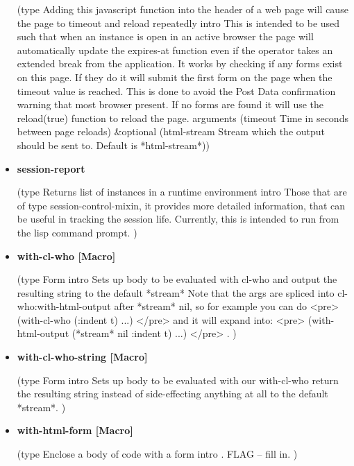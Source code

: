 \documentclass [11pt]{book}
\begin{document}
\begin{itemize}
(type
 Adding this javascript function into the header of a web page will cause the page to timeout and reload repeatedly
 intro  This is intended to be used such that when
an instance is open in an active browser the page will automatically update the expires-at function even if the operator takes an extended break from the application.
It works by checking if any forms exist on this page. If they do it will submit the first form on the page when the timeout value is reached. This is done to avoid
the Post Data confirmation warning that most browser present. If no forms are found it will use the reload(true) function to reload the page.
 arguments (timeout Time in seconds between page reloads) \&optional
 (html-stream
  Stream which the output should be sent to. Default is *html-stream*))



\item {}
\label{prim:session-report}
\textbf{session-report}

(type Returns list of instances in a runtime environment intro
  Those that are of type session-control-mixin, it provides more detailed information, that can be useful in tracking the session life. Currently, this is intended to run from the lisp command prompt.
)



\item {}
\label{prim:with-cl-who}
\textbf{with-cl-who [Macro]}

(type Form intro
  Sets up body to be evaluated with cl-who and output the resulting string to the default *stream*
Note that the args are spliced into cl-who:with-html-output after *stream* nil, so for example you can do <pre>
    (with-cl-who (:indent t) ...)
</pre>
and it will expand into:
<pre>
    (with-html-output (*stream* nil :indent t) ...)
</pre>
.
)



\item {}
\label{prim:with-cl-who-string}
\textbf{with-cl-who-string [Macro]}

(type Form intro
  Sets up body to be evaluated with our with-cl-who return the resulting string instead
of side-effecting anything at all to the default *stream*.
)



\item {}
\label{prim:with-html-form}
\textbf{with-html-form [Macro]}

(type Enclose a body of code with a form intro .
 FLAG -- fill in. 
)



\end{itemize}
\end{document}
